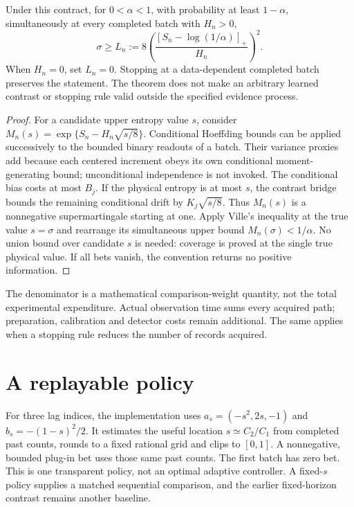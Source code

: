 \begin{theorem}
Under this contract, for $0<\alpha<1$, with probability at least $1-\alpha$,
simultaneously at every completed batch with $H_n>0$,
\[
 \sigma\ge L_n:=8\left(
 \frac{[S_n-\log(1/\alpha)]_+}{H_n}\right)^2.
\]
When $H_n=0$, set $L_n=0$. Stopping at a data-dependent completed batch
preserves the statement. The theorem does not make an arbitrary learned
contrast or stopping rule valid outside the specified evidence process.
\end{theorem}
\begin{proof}
For a candidate upper entropy value $s$, consider
$M_n(s)=\exp\{S_n-H_n\sqrt{s/8}\}$. Conditional Hoeffding bounds can be
applied successively to the bounded binary readouts of a batch. Their variance
proxies add because each centered increment obeys its own conditional
moment-generating bound; unconditional independence is not invoked.
The conditional bias costs at most $B_j$. If the physical entropy is at most
$s$, the contrast bridge bounds the remaining conditional drift by
$K_j\sqrt{s/8}$. Thus $M_n(s)$ is a nonnegative supermartingale starting at
one. Apply Ville's inequality at the true value $s=\sigma$ and rearrange its
simultaneous upper bound $M_n(\sigma)<1/\alpha$. No union bound over candidate
$s$ is needed: coverage is proved at the single true physical value.
If all bets vanish, the convention returns no positive information.
\end{proof}

The denominator is a mathematical comparison-weight quantity, not the total
experimental expenditure. Actual observation time sums every acquired path;
preparation, calibration and detector costs remain additional. The same applies
when a stopping rule reduces the number of records acquired.

\section{A replayable policy}
For three lag indices, the implementation uses
$a_s=(-s^2,2s,-1)$ and $b_s=-(1-s)^2/2$. It estimates the useful location
$s\simeq C_2/C_1$ from completed past counts, rounds to a fixed rational grid
and clips to $[0,1]$. A nonnegative, bounded plug-in bet uses those same past
counts. The first batch has zero bet. This is one transparent policy, not an
optimal adaptive controller. A fixed-$s$ policy supplies a matched sequential
comparison, and the earlier fixed-horizon contrast remains another baseline.

